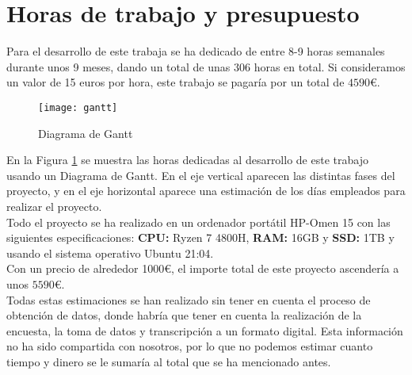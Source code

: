 \section{Horas de trabajo y presupuesto}
Para el desarrollo de este trabaja se ha dedicado de entre 8-9 horas semanales durante unos 9 meses, dando un total de unas $306$ horas en total. Si consideramos un valor de 15 euros por hora, este trabajo se pagaría por un total de $4590$\euro. 
\begin{figure}[H]
 	\texttt{[image: gantt]}
	\caption{Diagrama de Gantt}
	\label{fig:gantt}
\end{figure}
En la Figura \ref{fig:gantt} se muestra las horas dedicadas al desarrollo de este trabajo usando un Diagrama de Gantt. En el eje vertical aparecen las distintas fases del proyecto, y en el eje horizontal aparece una estimación de los días empleados para realizar el proyecto.\\
\linebreak
Todo el proyecto se ha realizado en un ordenador portátil HP-Omen 15 con las siguientes especificaciones: \textbf{CPU:} Ryzen 7 4800H, \textbf{RAM:} 16GB y \textbf{SSD:} 1TB y usando el sistema operativo Ubuntu 21:04.\\
Con un precio de alrededor 1000\euro, el importe total de este proyecto ascendería a unos $5590$\euro.\\
\linebreak
Todas estas estimaciones se han realizado sin tener en cuenta el proceso de obtención de datos, donde habría que tener en cuenta la realización de la encuesta, la toma de datos y transcripción a un formato digital. Esta información no ha sido compartida con nosotros, por lo que no podemos estimar cuanto tiempo y dinero se le sumaría al total que se ha mencionado antes.
\clearpage
